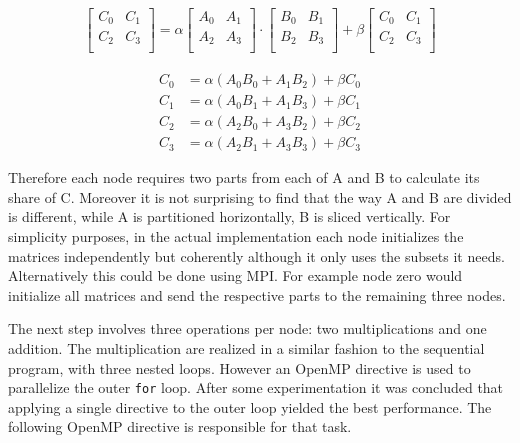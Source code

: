 \begin{align}
    \begin{bmatrix}
      C_0 & C_1 \\
      C_2 & C_3 \\
    \end{bmatrix}
= \alpha
    \begin{bmatrix}
      A_0 & A_1 \\
      A_2 & A_3 \\
    \end{bmatrix}
\cdot
    \begin{bmatrix}
      B_0 & B_1 \\
      B_2 & B_3 \\
    \end{bmatrix}
+ \beta
    \begin{bmatrix}
      C_0 & C_1 \\
      C_2 & C_3 \\
    \end{bmatrix}
\label{eq:partition}
\end{align}

\begin{align}
C_0 &= \alpha (A_0 B_0 + A_1 B_2) + \beta C_0\\
C_1 &= \alpha (A_0 B_1 + A_1 B_3) + \beta C_1\\
C_2 &= \alpha (A_2 B_0 + A_3 B_2) + \beta C_2\\
C_3 &= \alpha (A_2 B_1 + A_3 B_3) + \beta C_3
\label{eq:partition2}
\end{align}

Therefore each node requires two parts from each of A and B to calculate its share of C. Moreover it is not surprising to find that the way A and B are divided is different, while A is partitioned horizontally, B is sliced vertically. For simplicity purposes, in the actual implementation each node initializes the matrices independently but coherently although it only uses the subsets it needs. Alternatively this could be done using MPI. For example node zero would initialize all matrices and send the respective parts to the remaining three nodes.

The next step involves three operations per node: two multiplications and one addition. The multiplication are realized in a similar fashion to the sequential program, \ie with three nested loops. However an OpenMP directive is used to parallelize the outer \texttt{for} loop. After some experimentation it was concluded that applying a single directive to the outer loop yielded the best performance.
The following OpenMP directive is responsible for that task.

